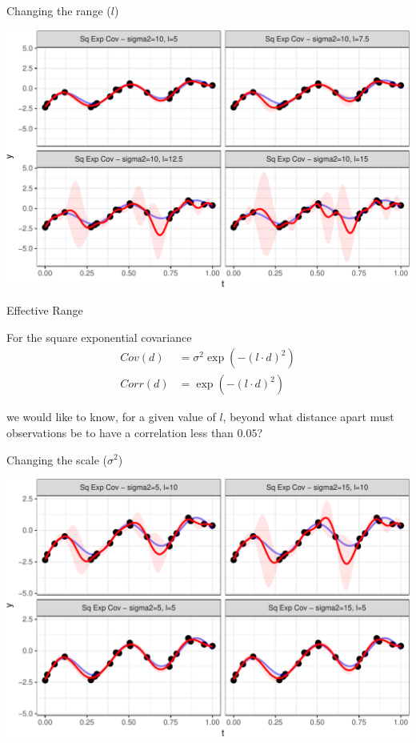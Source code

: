 \documentclass[11pt,ignorenonframetext,]{beamer}
\begin{document}
\begin{frame}{%
\protect\hypertarget{changing-the-range-l}{%
Changing the range (\(l\))}}

\begin{center}\includegraphics[width=\textwidth]{Lec12_files/figure-beamer/unnamed-chunk-14-1} \end{center}

\end{frame}

\begin{frame}[t]{%
\protect\hypertarget{effective-range}{%
Effective Range}}

For the square exponential covariance \[ \begin{aligned} 
Cov(d) &= \sigma^2 \exp\left(-(l \cdot d)^2\right) \\
Corr(d) &= \exp\left(-(l \cdot d)^2\right)
\end{aligned} \]

we would like to know, for a given value of \(l\), beyond what distance
apart must observations be to have a correlation less than \(0.05\)?

\end{frame}

\begin{frame}{%
\protect\hypertarget{changing-the-scale-sigma2}{%
Changing the scale (\(\sigma^2\))}}

\begin{center}\includegraphics[width=\textwidth]{Lec12_files/figure-beamer/unnamed-chunk-15-1} \end{center}

\end{frame}
\end{document}

